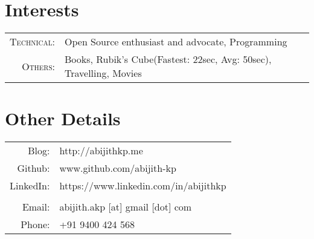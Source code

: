 \documentclass[a4paper,10pt]{article} %
\begin{document}


\section{Interests}

\begin{tabular}{rl}
        \textsc{Technical:}    & \textsf{Open Source enthusiast and advocate, Programming} \\
        \textsc{Others:}    & \textsf{Books, Rubik's Cube(Fastest: 22sec, Avg: 50sec), Travelling, Movies} \\
\end{tabular}


\section{Other Details}

\begin{tabular}{rl}
        \textsf{Blog:}    & \textsf{http://abijithkp.me} \\
        \textsf{Github:}  & \textsf{www.github.com/abijith-kp} \\
        \textsf{LinkedIn:}    & \textsf{https://www.linkedin.com/in/abijithkp} \\ \\
        \textsf{Email:}   & \textsf{abijith.akp [at] gmail [dot] com} \\
        \textsf{Phone:}   & +91 9400 424 568\\
\end{tabular}
\end{document}
